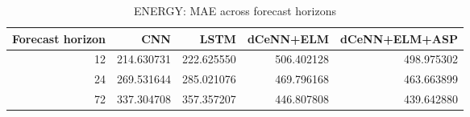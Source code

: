 \begin{table}
\caption{ENERGY: MAE across forecast horizons}
\begin{tabular}{rrrrr}
\toprule
Forecast horizon & CNN & LSTM & dCeNN+ELM & dCeNN+ELM+ASP \\
\midrule
12 & 214.630731 & 222.625550 & 506.402128 & 498.975302 \\
24 & 269.531644 & 285.021076 & 469.796168 & 463.663899 \\
72 & 337.304708 & 357.357207 & 446.807808 & 439.642880 \\
\bottomrule
\end{tabular}
\end{table}
